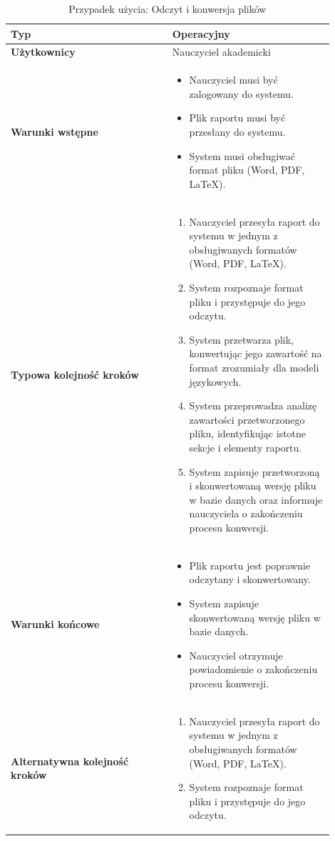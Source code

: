 \documentclass[a4paper, 12pt]{article}
\begin{document}
\begin{table}[H]
\footnotesize
\centering
\caption{Przypadek użycia: Odczyt i konwersja plików}
\begin{tabular}{|p{0.45\linewidth}|p{0.45\linewidth}|}
\hline
\textbf{Typ} & Operacyjny \\
\hline
\textbf{Użytkownicy} & Nauczyciel akademicki \\
\hline
\textbf{Warunki wstępne} & 
\begin{itemize}
    \item Nauczyciel musi być zalogowany do systemu.
    \item Plik raportu musi być przesłany do systemu.
    \item System musi obsługiwać format pliku (Word, PDF, LaTeX).
\end{itemize} \\
\hline
\textbf{Typowa kolejność kroków} &
\begin{enumerate}
    \item Nauczyciel przesyła raport do systemu w jednym z obsługiwanych formatów (Word, PDF, LaTeX).
    \item System rozpoznaje format pliku i przystępuje do jego odczytu.
    \item System przetwarza plik, konwertując jego zawartość na format zrozumiały dla modeli językowych.
    \item System przeprowadza analizę zawartości przetworzonego pliku, identyfikując istotne sekcje i elementy raportu.
    \item System zapisuje przetworzoną i skonwertowaną wersję pliku w bazie danych oraz informuje nauczyciela o zakończeniu procesu konwersji.
\end{enumerate} \\
\hline
\textbf{Warunki końcowe} & 
\begin{itemize}
    \item Plik raportu jest poprawnie odczytany i skonwertowany.
    \item System zapisuje skonwertowaną wersję pliku w bazie danych.
    \item Nauczyciel otrzymuje powiadomienie o zakończeniu procesu konwersji.
\end{itemize} \\
\hline
\textbf{Alternatywna kolejność kroków} &
\begin{enumerate}
    \item Nauczyciel przesyła raport do systemu w jednym z obsługiwanych formatów (Word, PDF, LaTeX).
    \item System rozpoznaje format pliku i przystępuje do jego odczytu.

\end{enumerate}
\end{tabular}
\end{table}
\end{document}
